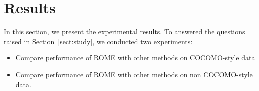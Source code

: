 \documentclass[sigconf,review]{acmart}
\newcommand{\quart}[4]{
\begin{picture}(100,6)%
    {
        \color{black}
        \put(#3,3)
        {\circle*{4}}
        \put(#1,3)
        {\line(1,0){#2}}
    }
\end{picture}
}
\newcommand{\ofr} {
{\textit{out-of-range}}
}
\newcommand{\bi}{\begin{itemize}}
\newcommand{\ei}{\end{itemize}}
\begin{document}






\section{Results}

In this section, we present the experimental results. To answered the questions raised in Section~\ref{sect:study}, we conducted two experiments:
\bi
\item Compare performance of ROME with other methods on COCOMO-style data
\item Compare performance of ROME with other methods on non COCOMO-style data.
\ei 
\end{document}
